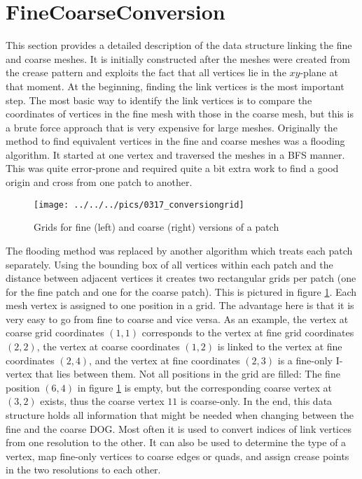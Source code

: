 \documentclass[a4paper,twoside,12pt,nochapterprefix]{scrbook}
\begin{document}
\section{FineCoarseConversion}\label{sec:conversion} %
This section provides a detailed description of the data structure linking the fine and coarse meshes. It is initially constructed after the meshes were created from the crease pattern and exploits the fact that all vertices lie in the $xy$-plane at that moment.\newline
At the beginning, finding the link vertices is the most important step. The most basic way to identify the link vertices is to compare the coordinates of vertices in the fine mesh with those in the coarse mesh, but this is a brute force approach that is very expensive for large meshes.\newline
Originally the method to find equivalent vertices in the fine and coarse meshes was a flooding algorithm. It started at one vertex and traversed the meshes in a BFS manner. This was quite error-prone and required quite a bit extra work to find a good origin and cross from one patch to another.\newline
\begin{figure}
    \centering
    \texttt{[image: ../../../pics/0317\_conversiongrid]}
    \caption{Grids for fine (left) and coarse (right) versions of a patch}
    \label{fig:conversion_grid}
\end{figure}
The flooding method was replaced by another algorithm which treats each patch separately. Using the bounding box of all vertices within each patch and the distance between adjacent vertices it creates two rectangular grids per patch (one for the fine patch and one for the coarse patch). This is pictured in figure \ref{fig:conversion_grid}. Each mesh vertex is assigned to one position in a grid. The advantage here is that it is very easy to go from fine to coarse and vice versa. As an example, the vertex at coarse grid coordinates $(1,1)$ corresponds to the vertex at fine grid coordinates $(2,2)$, the vertex at coarse coordinates $(1,2)$ is linked to the vertex at fine coordinates $(2,4)$, and the vertex at fine coordinates $(2,3)$ is a fine-only I-vertex that lies between them. Not all positions in the grid are filled: The fine position $(6,4)$ in figure \ref{fig:conversion_grid} is empty, but the corresponding coarse vertex at $(3,2)$ exists, thus the coarse vertex $11$ is coarse-only.\newline
In the end, this data structure holds all information that might be needed when changing between the fine and the coarse DOG. Most often it is used to convert indices of link vertices from one resolution to the other. It can also be used to determine the type of a vertex, map fine-only vertices to coarse edges or quads, and assign crease points in the two resolutions to each other.\newline
\end{document}
